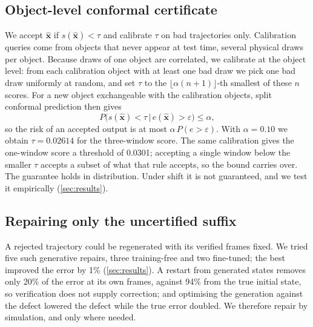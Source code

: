 \subsection{Object-level conformal certificate}
\label{sec:certificate}
We accept $\hat{\mathbf{x}}$ if $s(\hat{\mathbf{x}}) < \tau$ and calibrate $\tau$ on bad trajectories only.
Calibration queries come from objects that never appear at test time, several physical draws per object.
Because draws of one object are correlated, we calibrate at the object level: from each calibration object with at least one bad draw we pick one bad draw uniformly at random, and set $\tau$ to the $\lfloor \alpha (n+1) \rfloor$-th smallest of these $n$ scores.
For a new object exchangeable with the calibration objects, split conformal prediction then gives
\begin{equation}
  P\big(s(\hat{\mathbf{x}}) < \tau \,\big|\, e(\hat{\mathbf{x}}) > \varepsilon\big) \le \alpha ,
\end{equation}
so the risk of an accepted output is at most $\alpha\,P(e > \varepsilon)$.
With $\alpha = 0.10$ we obtain $\tau = 0.02614$ for the three-window score.
The same calibration gives the one-window score a threshold of 0.0301; accepting a single window below the smaller $\tau$ accepts a subset of what that rule accepts, so the bound carries over.
The guarantee holds in distribution. Under shift it is not guaranteed, and we test it empirically (\cref{sec:results}).

\subsection{Repairing only the uncertified suffix}
\label{sec:repair}
A rejected trajectory could be regenerated with its verified frames fixed.
We tried five such generative repairs, three training-free and two fine-tuned; the best improved the error by 1\% (\cref{sec:results}). A restart from generated states removes only 20\% of the error at its own frames, against 94\% from the true initial state, so verification does not supply correction; and optimising the generation against the defect lowered the defect while the true error doubled.
We therefore repair by simulation, and only where needed.

